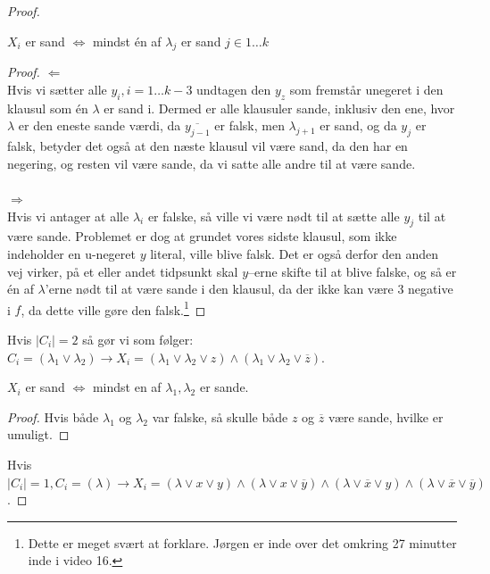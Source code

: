 \begin{proof}
	\begin{claim}
		$X_{i}$ er sand $\iff$ mindst én af $\lambda_{j}$ er sand $j \in 1 \ldots k$
	\end{claim}

	\begin{proof}
		\(\Leftarrow\)\\
		\noindent
		Hvis vi sætter alle $y_{i}, i = 1 \ldots k-3$  undtagen den $y_{z}$  som fremstår unegeret i den klausul som én \(\lambda\) er sand i. Dermed er alle klausuler sande, inklusiv den ene, hvor \(\lambda\) er den eneste sande værdi, da $\overline{y_{j-1}}$ er falsk, men \(\lambda_{j+1}\) er sand, og da $y_{j}$ er falsk, betyder det også at den næste klausul vil være sand, da den har en negering, og resten vil være sande, da vi satte alle andre til at være sande.\\\\
		\noindent
		\(\Rightarrow\)\\
		\noindent
		Hvis vi antager at alle $\lambda_{i}$ er falske, så ville vi være nødt til at sætte alle $y_{j}$ til at være sande. Problemet er dog at grundet vores sidste klausul, som ikke indeholder en u-negeret $y$ literal, ville blive falsk. Det er også derfor den anden vej virker, på et eller andet tidpsunkt skal $y$--erne skifte til at blive falske, og så er én af $\lambda$'erne nødt til at være sande i den klausul, da der ikke kan være 3 negative i $f$, da dette ville gøre den falsk.\footnote{Dette er meget svært at forklare. Jørgen er inde over det omkring 27 minutter inde i video 16.}
	\end{proof}

	Hvis $|C_{i}| = 2$ så gør vi som følger: $C_{i} = (\lambda_{1} \vee \lambda_{2}) \rightarrow X_{i} = (\lambda_{1} \vee \lambda_{2} \vee z) \wedge (\lambda_{1} \vee \lambda_{2} \vee \overline{z})$.

	\begin{claim}
		$X_{i}$ er sand $\iff$ mindst en af \(\lambda_{1}, \lambda_{2}\) er sande.
	\end{claim}

	\begin{proof}
		Hvis både \(\lambda_{1}\) og \(\lambda_{2}\) var falske, så skulle både $z$ og $\overline{z}$ være sande, hvilke er umuligt.
	\end{proof}

	Hvis $|C_{i}| = 1, C_{i} = (\lambda) \rightarrow X_{i} = (\lambda \vee x \vee y) \wedge (\lambda \vee x \vee \overline{y}) \wedge (\lambda \vee \overline{x} \vee y) \wedge (\lambda \vee \overline{x} \vee \overline{y})$.


\end{proof}
